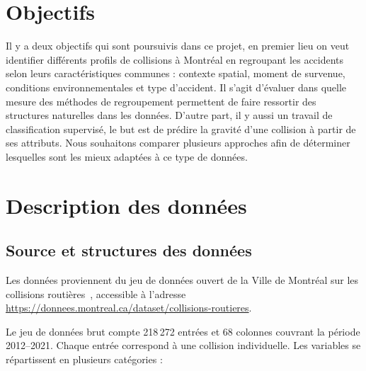 \documentclass[12pt]{article}
\begin{document}
 
 
\section{Objectifs}
 
Il y a deux objectifs qui sont poursuivis dans ce projet, en premier lieu on veut identifier différents profils de collisions à Montréal en regroupant les
accidents selon leurs caractéristiques communes : contexte spatial, moment de survenue, conditions environnementales et type d'accident.
Il s'agit d'évaluer dans quelle mesure des méthodes de regroupement permettent de faire ressortir des structures naturelles dans les données. D'autre part, il y aussi un travail de classification supervisé, le but est de prédire la gravité d'une collision à partir de ses attributs.
Nous souhaitons comparer plusieurs approches afin de déterminer lesquelles
sont les mieux adaptées à ce type de données.
 
 
 
\section{Description des données}
 
\subsection{Source et structures des données}
 
Les données proviennent du jeu de données ouvert de la Ville de Montréal sur les collisions routières~\cite{donnees_mtl}, accessible à
l'adresse \url{https://donnees.montreal.ca/dataset/collisions-routieres}. 
 
Le jeu de données brut compte 218\,272 entrées et 68 colonnes couvrant la période 2012--2021.
Chaque entrée correspond à une collision individuelle. Les variables se répartissent en plusieurs catégories :
 
\end{document}
